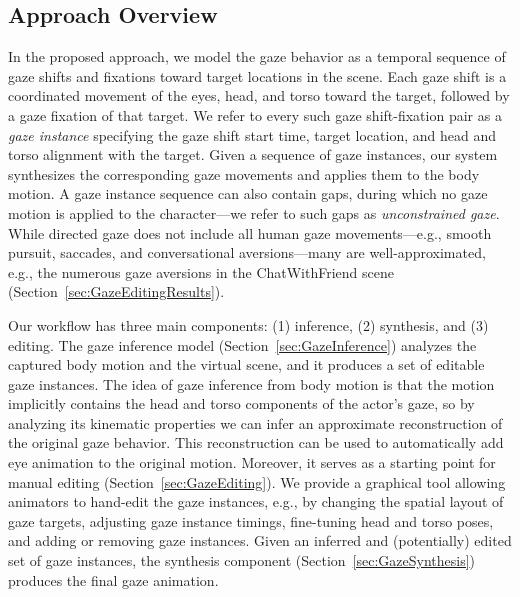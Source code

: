\subsection{Approach Overview}

In the proposed approach, we model the gaze behavior as a temporal sequence of gaze shifts and fixations toward target locations in the scene. Each gaze shift is a coordinated movement of the eyes, head, and torso toward the target, followed by a gaze fixation of that target. We refer to every such gaze shift-fixation pair as a \emph{gaze instance} specifying the gaze shift start time, target location, and head and torso alignment with the target. Given a sequence of gaze instances, our system synthesizes the corresponding gaze movements and applies them to the body motion. A gaze instance sequence can also contain gaps, during which no gaze motion is applied to the character---we refer to such gaps as \emph{unconstrained gaze}.
While directed gaze does not include all human gaze movements---e.g., smooth pursuit, saccades, and conversational aversions---many are well-approximated, e.g., the numerous gaze aversions in the ChatWithFriend scene (Section~\ref{sec:GazeEditingResults}).

Our workflow has three main components: (1) inference, (2) synthesis, and (3) editing. The gaze inference model (Section~\ref{sec:GazeInference}) analyzes the captured body motion and the virtual scene, and it produces a set of editable gaze instances. The idea of gaze inference from body motion is that the motion implicitly contains the head and torso components of the actor's gaze, so by analyzing its kinematic properties we can infer an approximate reconstruction of the original gaze behavior. This reconstruction can be used to automatically add eye animation to the original motion. Moreover, it serves as a starting point for manual editing (Section~\ref{sec:GazeEditing}). We provide a graphical tool allowing animators to hand-edit the gaze instances, e.g., by changing the spatial layout of gaze targets, adjusting gaze instance timings, fine-tuning head and torso poses, and adding or removing gaze instances. Given an inferred and (potentially) edited set of gaze instances, the synthesis component (Section~\ref{sec:GazeSynthesis}) produces the final gaze animation. 